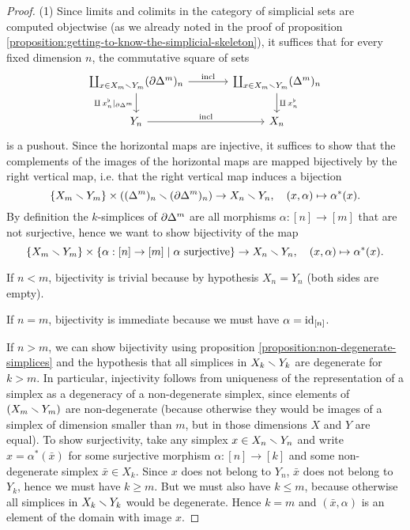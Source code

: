\begin{proof} (1) Since limits and colimits in the category of simplicial sets are computed objectwise (as we already noted in the proof of proposition \ref{proposition:getting-to-know-the-simplicial-skeleton}), it suffices that for every fixed dimension $n$, the commutative square of sets
\[
\begin{tikzcd}[column sep=large]
\coprod_{x\in X_m\sm Y_m}(\de\Delta^m)_n \ar[d,"\amalg\,x^\flat_n|_{\de\Delta^m}"'] \ar[r,"\incl"] & \coprod_{x\in X_m\sm Y_m}(\Delta^m)_n \ar[d,"\amalg\,x^\flat_n"]\\
Y_n \ar[r,"\incl"] & X_n
\end{tikzcd}
\]
is a pushout. Since the horizontal maps are injective, it suffices to show that the complements of the images of the horizontal maps are mapped bijectively by the right vertical map, i.e. that the right vertical map induces a bijection
\[\{X_m\smallsetminus Y_m\}\times((\Delta^m)_n\smallsetminus(\partial\Delta^m)_n)\to X_n\smallsetminus Y_n,\quad(x,\alpha)\mapsto\alpha^*(x).\]
By definition the $k$-simplices of $\partial\Delta^m$ are all morphisms $\alpha:[n]\to[m]$ that are not surjective, hence we want to show bijectivity of the map
\[\{X_m\smallsetminus Y_m\}\times\{\alpha:[n]\to[m]\mid\alpha\text{ surjective}\}\to X_n\smallsetminus Y_n,\quad(x,\alpha)\mapsto\alpha^*(x).\]

If $n<m$, bijectivity is trivial because by hypothesis $X_n=Y_n$ (both sides are empty).

If $n=m$, bijectivity is immediate because we must have $\alpha=\operatorname{id}_{[n]}$.

If $n>m$, we can show bijectivity using proposition \ref{proposition:non-degenerate-simplices} and the hypothesis that all simplices in $X_k\smallsetminus Y_k$ are degenerate for $k>m$. In particular, injectivity follows from uniqueness of the representation of a simplex as a degeneracy of a non-degenerate simplex, since elements of $(X_m\smallsetminus Y_m)$ are non-degenerate (because otherwise they would be images of a simplex of dimension smaller than $m$, but in those dimensions $X$ and $Y$ are equal). To show surjectivity, take any simplex $x\in X_n\smallsetminus Y_n$ and write $x=\alpha^*(\bar x)$ for some surjective morphism $\alpha:[n]\to[k]$ and some non-degenerate simplex $\bar x\in X_k$. Since $x$ does not belong to $Y_n$, $\bar x$ does not belong to $Y_k$, hence we must have $k\ge m$. But we must also have $k\le m$, because otherwise all simplices in $X_k\smallsetminus Y_k$ would be degenerate. Hence $k=m$ and $(\bar x,\alpha)$ is an element of the domain with image $x$.


\end{proof}
